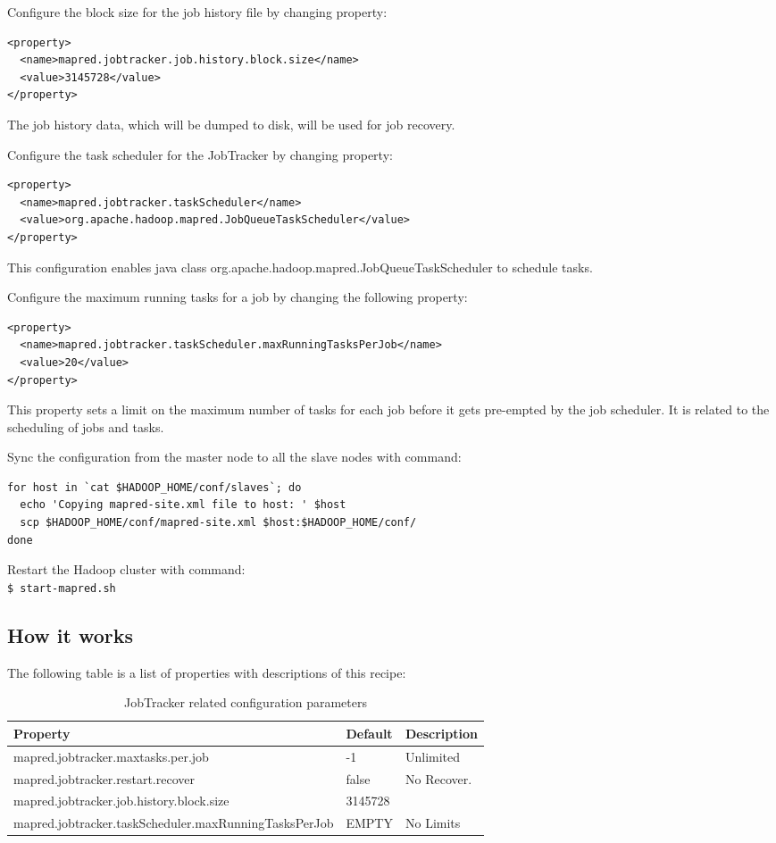 Configure the block size for the job history file by changing property:
\lstset{style=bashstyle}
\begin{lstlisting}
<property>
  <name>mapred.jobtracker.job.history.block.size</name>
  <value>3145728</value>
</property>
\end{lstlisting}

The job history data, which will be dumped to disk, will be used for job recovery.


Configure the task scheduler for the JobTracker by changing property:
\lstset{style=bashstyle}
\begin{lstlisting}
<property>
  <name>mapred.jobtracker.taskScheduler</name>
  <value>org.apache.hadoop.mapred.JobQueueTaskScheduler</value>
</property>
\end{lstlisting}
This configuration enables java class org.apache.hadoop.mapred.JobQueueTaskScheduler to schedule tasks.


Configure the maximum running tasks for a job by changing the following property:
\lstset{style=bashstyle}
\begin{lstlisting}
<property>
  <name>mapred.jobtracker.taskScheduler.maxRunningTasksPerJob</name>
  <value>20</value>
</property>
\end{lstlisting}

This property sets a limit on the maximum number of tasks for each job before it gets pre-empted by the job scheduler. It is related to the scheduling of jobs and tasks.

Sync the configuration from the master node to all the slave nodes with command:
\lstset{style=bashstyle}
\begin{lstlisting}
for host in `cat $HADOOP_HOME/conf/slaves`; do
  echo 'Copying mapred-site.xml file to host: ' $host
  scp $HADOOP_HOME/conf/mapred-site.xml $host:$HADOOP_HOME/conf/
done
\end{lstlisting}


Restart the Hadoop cluster with command: \\
\verb|$ start-mapred.sh|

\subsection*{How it works}
The following table is a list of properties with descriptions of this recipe:

\begin{table}[h]
  \centering
  \begin{tabular}{lll}
    \toprule
    \textbf{Property} & \textbf{Default} & \textbf{Description} \\ \midrule
    mapred.jobtracker.maxtasks.per.job & -1 & Unlimited \\
    mapred.jobtracker.restart.recover & false & No Recover. \\
    mapred.jobtracker.job.history.block.size & 3145728 & \\
    mapred.jobtracker.taskScheduler.maxRunningTasksPerJob & EMPTY & No Limits \\ \bottomrule
  \end{tabular}
  \caption{JobTracker related configuration parameters}\label{tbl:jobtracker}
\end{table}

